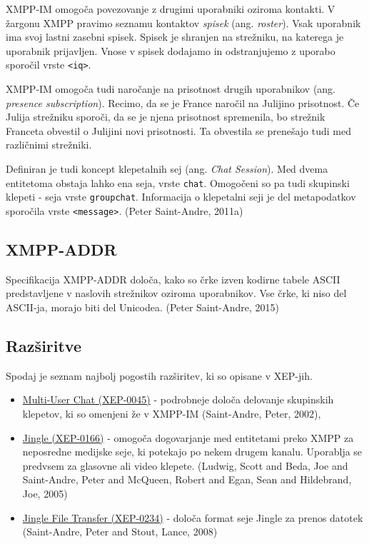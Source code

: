 \documentclass[11pt]{article}
\begin{document}
XMPP-IM omogoča povezovanje z drugimi uporabniki oziroma kontakti. V
žargonu XMPP pravimo seznamu kontaktov \emph{spisek} (ang. \emph{roster}). Vsak
uporabnik ima svoj lastni zasebni spisek. Spisek je shranjen na
strežniku, na katerega je uporabnik prijavljen. Vnose v spisek
dodajamo in odstranjujemo z uporabo sporočil vrste \texttt{<iq>}.

XMPP-IM omogoča tudi naročanje na prisotnost drugih uporabnikov
(ang. \emph{presence subscription}). Recimo, da se je France naročil na
Julijino prisotnost. Če Julija strežniku sporoči, da se je njena
prisotnost spremenila, bo strežnik Franceta obvestil o Julijini novi
prisotnosti. Ta obvestila se prenešajo tudi med različnimi strežniki.

Definiran je tudi koncept klepetalnih sej (ang. \emph{Chat Session}). Med
dvema entitetoma obstaja lahko ena seja, vrste \texttt{chat}. Omogočeni so
pa tudi skupinski klepeti - seja vrste \texttt{groupchat}. Informacija o
klepetalni seji je del metapodatkov sporočila vrste
\texttt{<message>}. (Peter Saint-Andre, 2011a)

\subsection{XMPP-ADDR}
\label{sec:orge831d87}

Specifikacija XMPP-ADDR določa, kako so črke izven kodirne tabele
ASCII predstavljene v naslovih strežnikov oziroma uporabnikov. Vse
črke, ki niso del ASCII-ja, morajo biti del Unicodea. (Peter Saint-Andre, 2015)

\subsection{Razširitve}
\label{sec:org78cce78}

Spodaj je seznam najbolj pogostih razširitev, ki so opisane v XEP-jih.

\begin{itemize}
\item \href{https://xmpp.org/extensions/xep-0045.html}{Multi-User Chat (XEP-0045)} - podrobneje določa delovanje skupinskih
klepetov, ki so omenjeni že v XMPP-IM (Saint-Andre, Peter, 2002),
\item \href{https://xmpp.org/extensions/xep-0166.html}{Jingle (XEP-0166)} - omogoča dogovarjanje med entitetami preko XMPP
za neposredne medijske seje, ki potekajo po nekem drugem
kanalu. Uporablja se predvsem za glasovne ali video
klepete. (Ludwig, Scott and Beda, Joe and Saint-Andre, Peter and McQueen, Robert and Egan, Sean and Hildebrand, Joe, 2005)
\item \href{https://xmpp.org/extensions/xep-0234.html}{Jingle File Transfer (XEP-0234)} - določa format seje Jingle za
prenos datotek (Saint-Andre, Peter and Stout, Lance, 2008)
\end{itemize}
\end{document}
